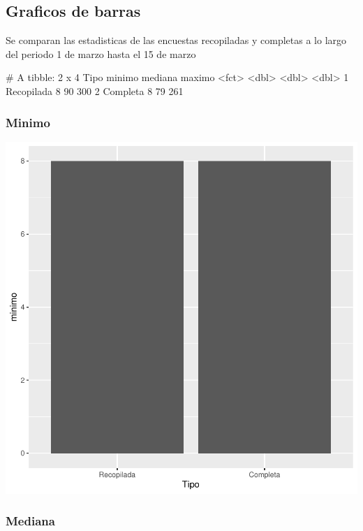 \documentclass{article}
\begin{document}
\subsection{Graficos de barras}
Se comparan las estadisticas de las encuestas recopiladas y completas a lo largo del periodo 1 de marzo hasta el 15 de marzo

\begin{Schunk}
\begin{Soutput}
# A tibble: 2 x 4
  Tipo       minimo mediana maximo
  <fct>       <dbl>   <dbl>  <dbl>
1 Recopilada      8      90    300
2 Completa        8      79    261
\end{Soutput}
\end{Schunk}

\subsubsection{Minimo}

\includegraphics{seguimento2-046}

\subsubsection{Mediana}
\end{document}
